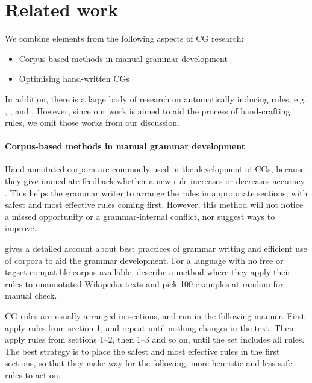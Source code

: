 


\section{Related work}
\label{sec:CGanaRelated}

We combine elements from the following aspects of CG research:

\begin{itemize}
\item Corpus-based methods in manual grammar development \cite{voutilainen2004}
\item Optimising hand-written CGs~\cite{bick2013tuning}
\end{itemize}

In addition, there is a large body of research on automatically
inducing rules, e.g. \cite{inducing_cg1996}, \cite{lindberg_eineborg98ilp},
\cite{lager01transformation} and \cite{asfrent14}.
However, since our work is aimed to aid the process of hand-crafting rules, we omit those works from our discussion.


\paragraph{Corpus-based methods in manual grammar development}

Hand-annotated corpora are commonly used in the development of CGs, because they give immediate feedback whether a new rule increases or decreases accuracy \cite{voutilainen2004}.
This helps the grammar writer to arrange the rules in appropriate sections, with safest and most effective rules coming first.
However, this method will not notice a missed opportunity or a grammar-internal conflict, nor suggest ways to improve.

\cite{voutilainen2004} gives a detailed account about best practices of grammar writing and efficient use of corpora to aid the grammar development.
For a language with no free or tagset-compatible corpus available, \cite{tyers_reynolds2015} describe a method where they apply their rules to unannotated Wikipedia texts and pick 100 examples at random for manual check.

CG rules are usually arranged in sections, and run in the following manner. 
First apply rules from section 1, and repeat until nothing changes in the text. Then apply rules from sections 1--2, then 1--3 and so on, until the set includes all rules.
The best strategy is to place the safest and most effective rules in the first sections,
so that they make way for the following, more heuristic and less safe rules to act on.

